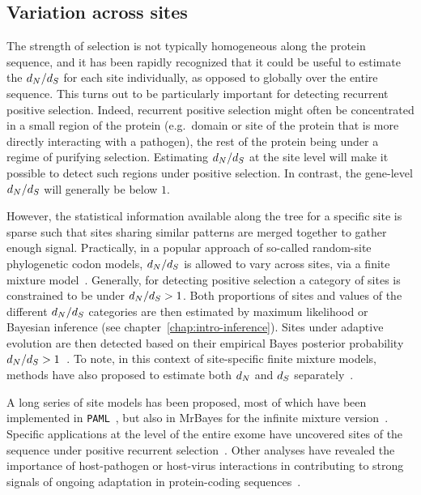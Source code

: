 \subsection{Variation across sites}
\label{subsec:variation-across-sites}

The strength of selection is not typically homogeneous along the protein sequence, and it has been rapidly recognized that it could be useful to estimate the $d_N / d_S$ for each site individually, as opposed to globally over the entire sequence.
This turns out to be particularly important for detecting recurrent positive selection.
Indeed, recurrent positive selection might often be concentrated in a small region of the protein (e.g.~domain or site of the protein that is more directly interacting with a pathogen), the rest of the protein being under a regime of purifying selection.
Estimating $d_N / d_S$ at the site level will make it possible to detect such regions under positive selection.
In contrast, the gene-level $d_N / d_S$ will generally be below $1$.

However, the statistical information available along the tree for a specific site is sparse such that sites sharing similar patterns are merged together to gather enough signal.
Practically, in a popular approach of so-called random-site phylogenetic \gls{codon} models, $d_N / d_S$ is allowed to vary across sites, via a finite mixture model~\citep{Nielsen1998, Yang2000, Yang2005, Huelsenbeck2006}.
Generally, for detecting positive selection a category of sites is constrained to be under $d_N / d_S > 1$.
Both proportions of sites and values of the different $d_N / d_S$ categories are then estimated by maximum \gls{likelihood} or Bayesian inference (see chapter~\ref{chap:intro-inference}).
Sites under adaptive evolution are then detected based on their empirical Bayes \gls{posterior} probability $d_N / d_S > 1$~\citep{Huelsenbeck2004,Yang2005}.
To note, in this context of site-specific finite \glspl{mixture model}, methods have also proposed to estimate both $d_N$ and $d_S$ separately~\citep{Pond2005a, Spielman2016}.

A long series of site models has been proposed, most of which have been implemented in \texttt{PAML}~\citep{Yang1997a,Yang2007}, but also in MrBayes for the infinite mixture version~\citep{Huelsenbeck2001, Ronquist2012}.
Specific applications at the level of the entire exome have uncovered sites of the sequence under positive recurrent selection~\citep{Kosiol2008}.
Other analyses have revealed the importance of host-pathogen or host-virus interactions in contributing to strong signals of ongoing adaptation in protein-coding sequences~\citep{Enard2016}.

